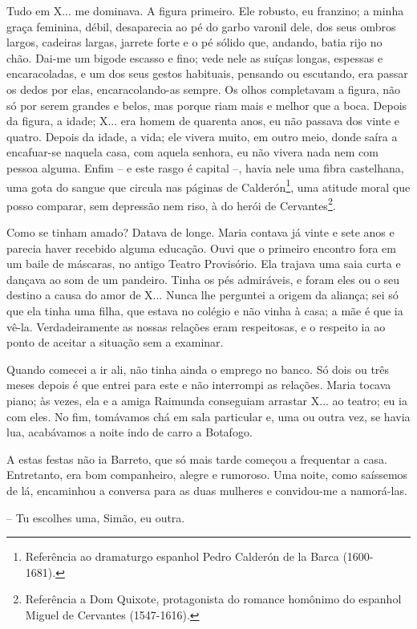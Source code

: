 Tudo em X... me dominava. A figura primeiro. Ele robusto, eu franzino; a
minha graça feminina, débil, desaparecia ao pé do garbo varonil dele,
dos seus ombros largos, cadeiras largas, jarrete forte e o pé sólido
que, andando, batia rijo no chão. Dai-me um bigode escasso e fino; vede
nele as suíças longas, espessas e encaracoladas, e um dos seus gestos
habituais, pensando ou escutando, era passar os dedos por elas,
encaracolando-as sempre. Os olhos completavam a figura, não só por serem
grandes e belos, mas porque riam mais e melhor que a boca. Depois da
figura, a idade; X... era homem de quarenta anos, eu não passava dos
vinte e quatro. Depois da idade, a vida; ele vivera muito, em outro
meio, donde saíra a encafuar-se naquela casa, com aquela senhora, eu não
vivera nada nem com pessoa alguma. Enfim -- e este rasgo é capital --,
havia nele uma fibra castelhana, uma gota do sangue que circula nas
páginas de Calderón\footnote{Referência ao dramaturgo espanhol Pedro
  Calderón de la Barca (1600-1681).}, uma atitude moral que posso
comparar, sem depressão nem riso, à do herói de Cervantes\footnote{Referência
  a Dom Quixote, protagonista do romance homônimo do espanhol Miguel de
  Cervantes (1547-1616).}.

Como se tinham amado? Datava de longe. Maria contava já vinte e sete
anos e parecia haver recebido alguma educação. Ouvi que o primeiro
encontro fora em um baile de máscaras, no antigo Teatro Provisório. Ela
trajava uma saia curta e dançava ao som de um pandeiro. Tinha os pés
admiráveis, e foram eles ou o seu destino a causa do amor de X... Nunca
lhe perguntei a origem da aliança; sei só que ela tinha uma filha, que
estava no colégio e não vinha à casa; a mãe é que ia vê-la.
Verdadeiramente as nossas relações eram respeitosas, e o respeito ia ao
ponto de aceitar a situação sem a examinar.

Quando comecei a ir ali, não tinha ainda o emprego no banco. Só dois ou
três meses depois é que entrei para este e não interrompi as relações.
Maria tocava piano; às vezes, ela e a amiga Raimunda conseguiam arrastar
X... ao teatro; eu ia com eles. No fim, tomávamos chá em sala particular
e, uma ou outra vez, se havia lua, acabávamos a noite indo de carro a
Botafogo.

A estas festas não ia Barreto, que só mais tarde começou a frequentar a
casa. Entretanto, era bom companheiro, alegre e rumoroso. Uma noite,
como saíssemos de lá, encaminhou a conversa para as duas mulheres e
convidou-me a namorá-las.

-- Tu escolhes uma, Simão, eu outra.

